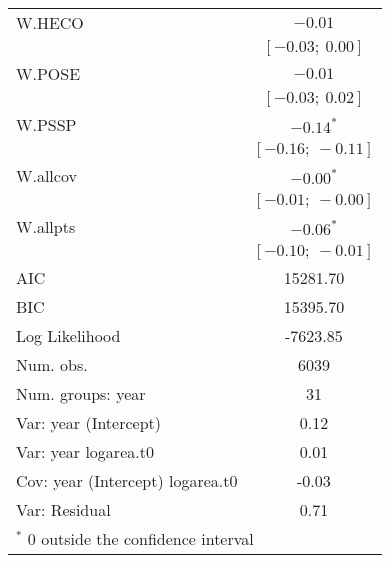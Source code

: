 \begin{table}
\begin{center}
\begin{tabular}{l c }
W.HECO                           & $-0.01$           \\
                                 & $[-0.03;\ 0.00]$  \\
W.POSE                           & $-0.01$           \\
                                 & $[-0.03;\ 0.02]$  \\
W.PSSP                           & $-0.14^{*}$       \\
                                 & $[-0.16;\ -0.11]$ \\
W.allcov                         & $-0.00^{*}$       \\
                                 & $[-0.01;\ -0.00]$ \\
W.allpts                         & $-0.06^{*}$       \\
                                 & $[-0.10;\ -0.01]$ \\
\hline
AIC                              & 15281.70          \\
BIC                              & 15395.70          \\
Log Likelihood                   & -7623.85          \\
Num. obs.                        & 6039              \\
Num. groups: year                & 31                \\
Var: year (Intercept)            & 0.12              \\
Var: year logarea.t0             & 0.01              \\
Cov: year (Intercept) logarea.t0 & -0.03             \\
Var: Residual                    & 0.71              \\
\hline
\multicolumn{2}{l}{\scriptsize{$^*$ 0 outside the confidence interval}}
\end{tabular}
\label{table:PSSPgrowth-byYr}
\end{center}
\end{table}


